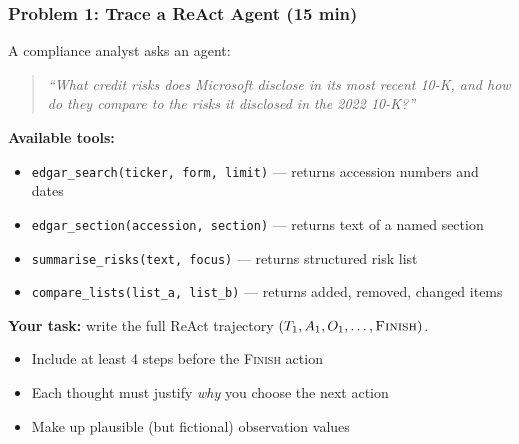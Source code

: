 \documentclass[9pt,t]{beamer}
\begin{document}
\begin{frame}
\frametitle{Problem 1: Trace a ReAct Agent (15 min)}

A compliance analyst asks an agent:

\begin{quote}
\textit{``What credit risks does Microsoft disclose in its most recent 10-K, and
how do they compare to the risks it disclosed in the 2022 10-K?''}
\end{quote}

\textbf{Available tools:}
\begin{itemize}
  \item \texttt{edgar\_search(ticker, form, limit)} --- returns accession numbers and dates
  \item \texttt{edgar\_section(accession, section)} --- returns text of a named section
  \item \texttt{summarise\_risks(text, focus)} --- returns structured risk list
  \item \texttt{compare\_lists(list\_a, list\_b)} --- returns added, removed, changed items
\end{itemize}

\medskip
\textbf{Your task:} write the full ReAct trajectory $(T_1, A_1, O_1, \ldots, \textsc{Finish})$.
\begin{itemize}
  \item Include at least 4 steps before the \textsc{Finish} action
  \item Each thought must justify \emph{why} you choose the next action
  \item Make up plausible (but fictional) observation values
\end{itemize}
\end{frame}
\end{document}
